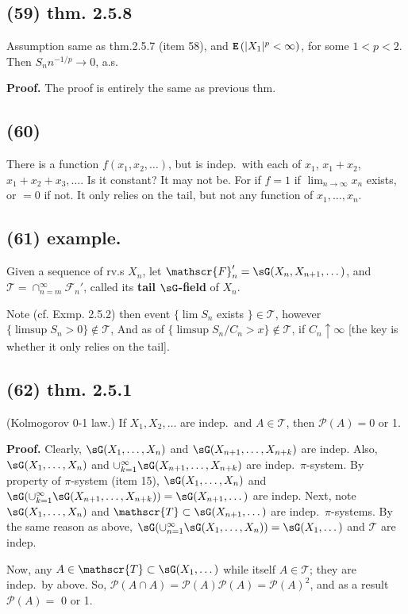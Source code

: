 \documentclass[12pt]{article}
\newcommand{\oo}\infty%
\newcommand{\Rb}[1]{ \left( #1 \right) }%
\newcommand{\CF}[1]{ \mathcal{#1} }%
\newcommand{\SF}[1]{ \mathscr{#1} }%
\newcommand{\Ss}[1]{\textsf{\bfseries{#1}}}%
\newcommand{\Tw}[1]{\texttt{\bfseries{#1}}}%
\renewcommand{\P}[1]{ \CF P \Rb{#1} }%
\newcommand{\E}[1]{ \Tw{E}\Rb{#1} }%
\begin{document}
\subsection*{(59) thm. 2.5.8} Assumption same as thm.2.5.7 (item 58), and \(\E{|X_1|^p <\oo}\), for some \(1 < p < 2\). 
Then \(S_n n^{-1/p} \to 0\), a.s. \par
\Ss{Proof.} The proof is entirely the same as previous thm. 

\subsection*{(60)} There is a function \(f(x_1,x_2,\dotsc)\), but is indep.\ with each of \(x_1\), \(x_1+x_2\), \(x_1+x_2+x_3,\dotsc\). 
Is it constant? It may not be. 
For if \(f=1\) if \(\lim_{n \to \oo} x_n\) exists, or \(=0\) if not. 
It only relies on the tail, but not any function of \(x_1,\dotsc,x_n\). 

\subsection*{(61) example.} Given a sequence of rv.s \(X_n\), let \(\SF{F}_n' = \sG(X_n,X_{n+1},\dotsc)\), and \(\SF{T} = \cap_{n=m}^\oo \SF{F}_n'\), called its \Ss{tail \(\sG\)-field} of \(X_n\). \par
Note (cf. Exmp. 2.5.2) then event \(\{\lim S_n\) exists \(\} \in \SF{T}\), 
however \(\{\limsup S_n >0\} \notin \SF{T}\), 
And as of \(\{\limsup S_n/C_n >x\} \notin \SF{T}\), if \(C_n \uparrow \oo\) [the key is whether it only relies on the tail]. 

\subsection*{(62) thm. 2.5.1} (Kolmogorov 0-1 law.) If \(X_1,X_2,\dotsc\) are indep.\  and \(A \in \SF{T}\), 
then \(\CF{P}(A) =0\) or 1. \par
\Ss{Proof.} Clearly, \(\sG(X_1,\dotsc,X_n)\) and \(\sG(X_{n+1},\dotsc,X_{n+k})\) are indep. 
Also, \(\sG(X_1,\dotsc,X_n)\) and \(\cup_{k=1}^\oo \sG(X_{n+1},\dotsc,X_{n+k})\) are indep.\  \(\pi\)-system. 
By property of \(\pi\)-system (item 15), \(\sG(X_1,\dotsc,X_n)\) and \(\sG(\cup_{k=1}^\oo \sG(X_{n+1},\dotsc,X_{n+k})) =\sG(X_{n+1},\dotsc)\) are indep. 
Next, note \(\sG(X_1,\dotsc,X_n)\) and \(\SF{T} \subset \sG(X_{n+1},\dotsc)\) are indep.\ \(\pi\)-systems. 
By the same reason as above, \(\sG(\cup_{n=1}^\oo \sG(X_1,\dotsc,X_n)) =\sG(X_1,\dotsc)\) and \(\SF{T}\) are indep. \par
Now, any \(A \in \SF{T} \subset \sG(X_1,\dotsc)\) while itself \(A \in \SF{T}\); they are indep.\ by above. 
So, \(\P{A \cap A} =\P{A}\P{A} =\P{A}^2\), and as a result \(\P{A} =\) 0 or 1. 
\end{document}
